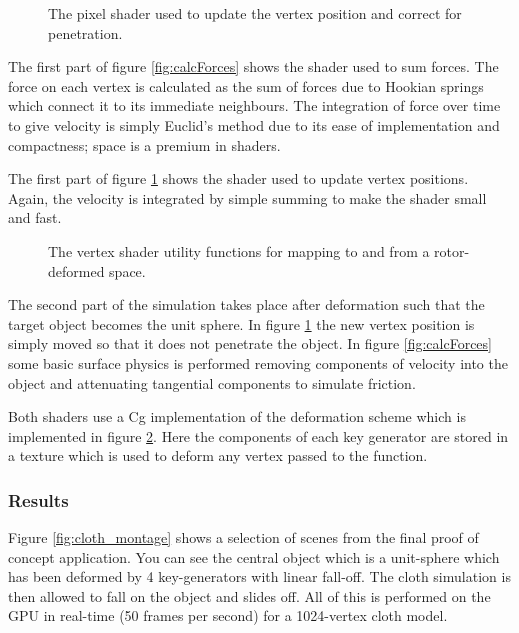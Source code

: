 \begin{figure}[p]
\centering
\scalebox{0.7}{
\begin{minipage}{\textwidth}
\singlespacing

\end{minipage}}
\caption{\label{fig:calcVertices}The pixel shader used to update the vertex position and
correct for penetration.}
\end{figure}

The first part of figure \ref{fig:calcForces} shows the shader used to sum forces. The force
on each vertex is calculated as the sum of forces due to Hookian springs which connect it
to its immediate neighbours. The integration of force over time to give velocity
is simply Euclid's method due to its ease of implementation and compactness; space is a premium
in shaders.

The first part of figure \ref{fig:calcVertices} shows the shader used to update vertex positions.
Again, the velocity is integrated by simple summing to make the shader small and fast.

\begin{figure}[p]
\centering
\scalebox{0.7}{
\begin{minipage}{\textwidth}
\singlespacing

\end{minipage}}
\caption{\label{fig:map}The vertex shader utility functions for mapping to and
  from a rotor-deformed space.}
\end{figure}

The second part of the simulation takes place after deformation such that the
target object becomes the unit sphere. In figure \ref{fig:calcVertices} the new
vertex position is simply moved so that it does not penetrate the object. In
figure \ref{fig:calcForces} some basic surface physics is performed removing
components of velocity into the object and attenuating tangential components to
simulate friction. 

Both shaders use a Cg implementation of the deformation scheme which is
implemented in figure \ref{fig:map}. Here the components of each key generator
are stored in a texture which is used to deform any vertex passed to the
function.

\subsubsection{Results}

Figure \ref{fig:cloth_montage} shows a selection of scenes from the final proof of concept application.
You can see the central object which is a unit-sphere which has been deformed
by 4 key-generators with linear fall-off. The cloth simulation is then allowed
to fall on the object and slides off. All of this is performed on the GPU in
real-time (50 frames per second) for a 1024-vertex cloth model.

